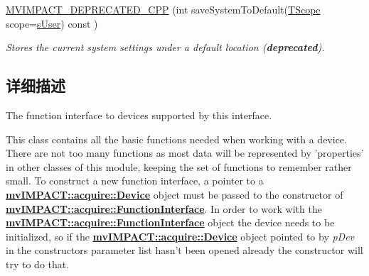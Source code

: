 \begin{DoxyCompactItemize}
$$\hyperlink{classmv_i_m_p_a_c_t_1_1acquire_1_1_function_interface_ae0f9f7f436a40980ce6d346ecc0e3030}{M\+V\+I\+M\+P\+A\+C\+T\+\_\+\+D\+E\+P\+R\+E\+C\+A\+T\+E\+D\+\_\+\+C\+P\+P} (int save\+System\+To\+Default(\hyperlink{group___common_interface_gae6cc8fec0123f239690564ecdeba4350}{T\+Scope} scope=\hyperlink{group___common_interface_ggae6cc8fec0123f239690564ecdeba4350a333304553cd48305e063dcda379bde79}{s\+User}) const )
\begin{DoxyCompactList}\small\item\em Stores the current system settings under a default location ({\bfseries deprecated}). \end{DoxyCompactList}\end{DoxyCompactItemize}


\subsection{详细描述}
The function interface to devices supported by this interface. 

This class contains all the basic functions needed when working with a device. There are not too many functions as most data will be represented by 'properties' in other classes of this module, keeping the set of functions to remember rather small. To construct a new function interface, a pointer to a {\bfseries \hyperlink{classmv_i_m_p_a_c_t_1_1acquire_1_1_device}{mv\+I\+M\+P\+A\+C\+T\+::acquire\+::\+Device}} object must be passed to the constructor of {\bfseries \hyperlink{classmv_i_m_p_a_c_t_1_1acquire_1_1_function_interface}{mv\+I\+M\+P\+A\+C\+T\+::acquire\+::\+Function\+Interface}}. In order to work with the {\bfseries \hyperlink{classmv_i_m_p_a_c_t_1_1acquire_1_1_function_interface}{mv\+I\+M\+P\+A\+C\+T\+::acquire\+::\+Function\+Interface}} object the device needs to be initialized, so if the {\bfseries \hyperlink{classmv_i_m_p_a_c_t_1_1acquire_1_1_device}{mv\+I\+M\+P\+A\+C\+T\+::acquire\+::\+Device}} object pointed to by {\itshape p\+Dev} in the constructors parameter list hasn't been opened already the constructor will try to do that. 

